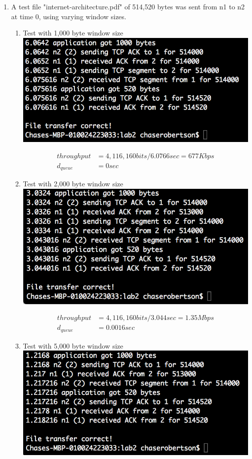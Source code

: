 \documentclass[fleqn,11pt]{article}
\begin{document}
\begin{enumerate}
\item A test file "internet-architecture.pdf" of 514,520 bytes was sent from n1 to n2 at time 0, using varying window sizes.

\begin{enumerate}
\item Test with 1,000 byte window size \\
\includegraphics{queue1000.png}

\begin{align*}
throughput &= 4,116,160 bits / 6.0766 sec = 677 Kbps  \\
d_{queue} &= 0 sec
\end{align*}

\item Test with 2,000 byte window size \\
\includegraphics{queue2000.png}

\begin{align*}
throughput &= 4,116,160 bits / 3.044 sec = 1.35 Mbps \\
d_{queue} &= 0.0016 sec
\end{align*}

\item Test with 5,000 byte window size \\
\includegraphics{queue5000.png}


\end{enumerate}
\end{enumerate}
\end{document}

